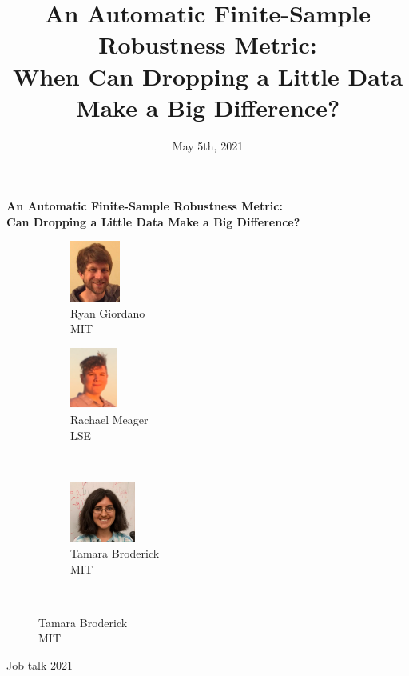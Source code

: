 \documentclass[10pt]{beamer}\usepackage[]{graphicx}\usepackage[]{color}
\title{An Automatic Finite-Sample Robustness Metric:
\\When Can Dropping a Little Data Make a Big Difference?}
\author{}
\date{May 5th, 2021}
\begin{document}

\begin{frame}

\begin{center}
\large
\textbf{
An Automatic Finite-Sample Robustness Metric:
\\Can Dropping a Little Data Make a Big Difference?}
\end{center}

\hrulefill

\begin{figure}
    \begin{subfigure}{0.32\textwidth}
        \centering
        \includegraphics[height=2cm]{collaborators/ryan}
        \caption*{Ryan Giordano \\ MIT}
    \end{subfigure}
    \begin{subfigure}{.32\textwidth}
        \centering
        \includegraphics[height=2cm]{collaborators/rachael}
    \captionsetup{justification=centering}
        \caption*{Rachael Meager \\ LSE}
    \end{subfigure}
    \vspace{0.11in}
\  		\begin{subfigure}{.32\textwidth}
        \centering
        \includegraphics[height=2cm]{collaborators/tamara}
        \caption*{Tamara Broderick \\ MIT}
    \end{subfigure}\\
\end{figure}
\hrulefill

Job talk 2021

\end{frame}
\end{document}

